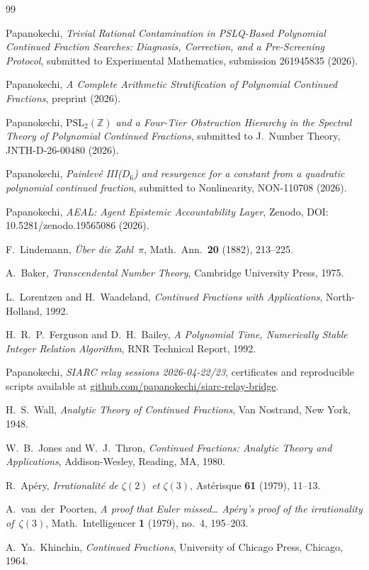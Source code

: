 \documentclass[12pt, reqno]{amsart}
\theoremstyle{definition}
\theoremstyle{remark}
\begin{document}
\begin{thebibliography}{99}

Papanokechi,
\emph{Trivial Rational Contamination in PSLQ-Based Polynomial
Continued Fraction Searches: Diagnosis, Correction, and a Pre-Screening Protocol},
submitted to Experimental Mathematics, submission 261945835 (2026).

Papanokechi,
\emph{A Complete Arithmetic Stratification of Polynomial Continued Fractions},
preprint (2026).

Papanokechi,
\emph{$\mathrm{PSL}_2(\mathbb{Z})$ and a Four-Tier Obstruction Hierarchy in the Spectral
Theory of Polynomial Continued Fractions},
submitted to J.\ Number Theory, JNTH-D-26-00480 (2026).

Papanokechi,
\emph{Painlev\'e III($D_6$) and resurgence for a constant from a quadratic
polynomial continued fraction},
submitted to Nonlinearity, NON-110708 (2026).

Papanokechi,
\emph{AEAL: Agent Epistemic Accountability Layer},
Zenodo, DOI: 10.5281/zenodo.19565086 (2026).

F.~Lindemann,
\emph{\"Uber die Zahl~$\pi$},
Math.\ Ann.\ \textbf{20} (1882), 213--225.

A.~Baker,
\emph{Transcendental Number Theory},
Cambridge University Press, 1975.

L.~Lorentzen and H.~Waadeland,
\emph{Continued Fractions with Applications},
North-Holland, 1992.

H.~R.~P.~Ferguson and D.~H.~Bailey,
\emph{A Polynomial Time, Numerically Stable Integer Relation Algorithm},
RNR Technical Report, 1992.

Papanokechi,
\emph{SIARC relay sessions 2026-04-22/23},
certificates and reproducible scripts available at
\url{github.com/papanokechi/siarc-relay-bridge}.

H.~S.~Wall,
\emph{Analytic Theory of Continued Fractions},
Van Nostrand, New York, 1948.

W.~B.~Jones and W.~J.~Thron,
\emph{Continued Fractions: Analytic Theory and Applications},
Addison-Wesley, Reading, MA, 1980.

R.~Ap\'ery,
\emph{Irrationalit\'e de $\zeta(2)$ et $\zeta(3)$},
Ast\'erisque \textbf{61} (1979), 11--13.

A.~van~der~Poorten,
\emph{A proof that Euler missed\ldots{}
Ap\'ery's proof of the irrationality of~$\zeta(3)$},
Math.\ Intelligencer \textbf{1} (1979), no.~4, 195--203.

A.~Ya.~Khinchin,
\emph{Continued Fractions},
University of Chicago Press, Chicago, 1964.

\end{thebibliography}
\end{document}

